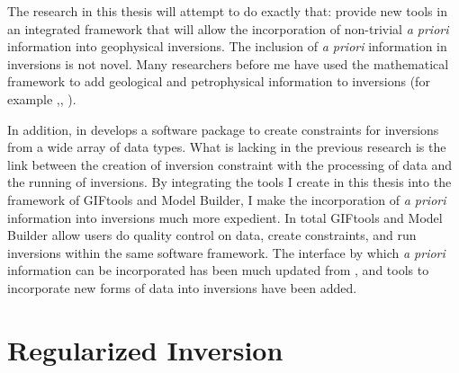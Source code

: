 The research in this thesis will attempt to do exactly that: provide new tools in an integrated framework that will allow the incorporation of non-trivial \emph{a priori} information into geophysical inversions. The inclusion of \emph{a priori} information in inversions is not novel. Many researchers before me have used the mathematical framework to add geological and petrophysical information to inversions (for example \citep{Lelievre2009Integrating},\citep{phillips2001thesis}, \cite{farquharson2008geologically}). 

In addition, in \cite{williams2008geologically} develops a software package to create constraints for inversions from a wide array of data types. What is lacking in the previous research is the link between the creation of inversion constraint with the processing of data and the running of inversions. By integrating the tools I create in this thesis into the framework of GIFtools and Model Builder, I make the incorporation of \emph{a priori} information into inversions much more expedient.  In total GIFtools and Model Builder allow users do quality control on data, create constraints, and run inversions within the same software framework. The interface by which \emph{a priori} information can be incorporated has been much updated from \citep{williams2008geologically}, and tools to incorporate new forms of data into inversions have been added. 




\section{Regularized Inversion}
\label{sec:Regularized Inversion}

